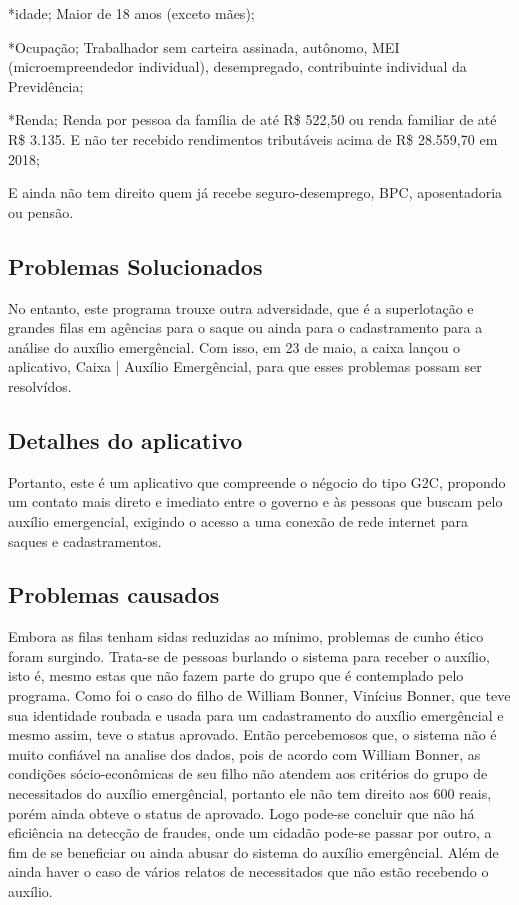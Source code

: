 \documentclass[12pt]{article}
\begin{document}
*idade; Maior de 18 anos (exceto mães);

*Ocupação; Trabalhador sem carteira assinada, autônomo, MEI (microempreendedor individual), desempregado, contribuinte individual da Previdência;

*Renda; Renda por pessoa da família de até R\$ 522,50 ou renda familiar de até R\$ 3.135. E não ter recebido rendimentos tributáveis acima de R\$ 28.559,70 em 2018;

E ainda não tem direito quem já recebe seguro-desemprego, BPC, aposentadoria ou pensão.

\subsection{Problemas Solucionados}
	No entanto, este programa trouxe outra adversidade, que é a superlotação e grandes filas em agências para o saque ou ainda para o cadastramento para a análise do auxílio emergêncial. Com isso, em 23 de maio, a caixa lançou o aplicativo, Caixa | Auxílio Emergêncial, para que esses problemas possam ser resolvídos.

\subsection{Detalhes do aplicativo}
	Portanto, este é um aplicativo que compreende o négocio do tipo G2C, propondo um contato mais direto e imediato entre o governo e às pessoas que buscam pelo auxílio emergencial, exigindo o acesso a uma conexão de rede internet para saques e cadastramentos.
\subsection{Problemas causados}
	Embora as filas tenham sidas reduzidas ao mínimo, problemas de cunho ético foram surgindo. Trata-se de pessoas burlando o sistema para receber o auxílio, isto é, mesmo estas que não fazem parte do grupo que é contemplado pelo programa. Como foi o caso do filho de William Bonner, Vinícius Bonner, que teve sua identidade roubada e usada para um cadastramento do auxílio emergêncial e mesmo assim, teve o status aprovado.
\linebreak
\linebreak
	Então percebemosos que, o sistema não é muito confiável na analise dos dados, pois de acordo com William Bonner, as condições sócio-econômicas de seu filho não atendem aos critérios do grupo de necessitados do auxílio emergêncial, portanto ele não tem direito aos 600 reais, porém ainda obteve o status de aprovado. Logo pode-se concluir que não há eficiência na detecção de fraudes, onde um cidadão pode-se passar por outro, a fim de se beneficiar ou ainda abusar do sistema do auxílio emergêncial. Além de ainda haver o caso de vários relatos de necessitados que não estão recebendo o auxílio.
\end{document}
